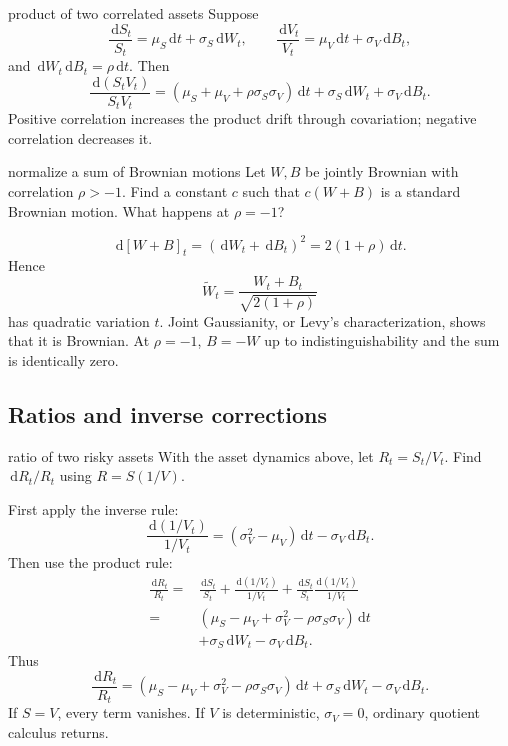 \documentclass[10pt]{article}
\newcommand{\1}{\mathbf 1}
\newcommand{\dd}{\,\mathrm d}
\theoremstyle{definition}
\begin{document}
\begin{boardexample}{product of two correlated assets}
Suppose
\[
\frac{\dd S_t}{S_t}
=\mu_S\dd t+\sigma_S\dd W_t,\qquad
\frac{\dd V_t}{V_t}
=\mu_V\dd t+\sigma_V\dd B_t,
\]
and \(\dd W_t\dd B_t=\rho\dd t\). Then
\[
\boxed{
\frac{\dd(S_tV_t)}{S_tV_t}
=\left(\mu_S+\mu_V+\rho\sigma_S\sigma_V\right)\dd t
+\sigma_S\dd W_t+\sigma_V\dd B_t.}
\]
Positive correlation increases the product drift through covariation;
negative correlation decreases it.
\end{boardexample}

\begin{studentexercise}{normalize a sum of Brownian motions}
Let \(W,B\) be jointly Brownian with correlation \(\rho>-1\). Find a
constant \(c\) such that \(c(W+B)\) is a standard Brownian motion. What
happens at \(\rho=-1\)?
\end{studentexercise}
\begin{shortsolution}
\[
\dd[W+B]_t
=(\dd W_t+\dd B_t)^2
=2(1+\rho)\dd t.
\]
Hence
\[
\boxed{
\widetilde W_t=\frac{W_t+B_t}{\sqrt{2(1+\rho)}}}
\]
has quadratic variation \(t\). Joint Gaussianity, or Levy's characterization,
shows that it is Brownian. At \(\rho=-1\), \(B=-W\) up to
indistinguishability and the sum is identically zero.
\end{shortsolution}

\subsection{Ratios and inverse corrections}

\begin{studentexercise}{ratio of two risky assets}
With the asset dynamics above, let \(R_t=S_t/V_t\). Find
\(\dd R_t/R_t\) using \(R=S(1/V)\).
\end{studentexercise}
\begin{shortsolution}
First apply the inverse rule:
\[
\frac{\dd(1/V_t)}{1/V_t}
=(\sigma_V^2-\mu_V)\dd t-\sigma_V\dd B_t.
\]
Then use the product rule:
\[
\begin{aligned}
\frac{\dd R_t}{R_t}
={}&\frac{\dd S_t}{S_t}
+\frac{\dd(1/V_t)}{1/V_t}
+\frac{\dd S_t}{S_t}
  \frac{\dd(1/V_t)}{1/V_t}\\
={}&\left(
\mu_S-\mu_V+\sigma_V^2-\rho\sigma_S\sigma_V
\right)\dd t\\
&+\sigma_S\dd W_t-\sigma_V\dd B_t.
\end{aligned}
\]
Thus
\[
\boxed{
\frac{\dd R_t}{R_t}
=\left(
\mu_S-\mu_V+\sigma_V^2-\rho\sigma_S\sigma_V
\right)\dd t
+\sigma_S\dd W_t-\sigma_V\dd B_t.}
\]
If \(S=V\), every term vanishes. If \(V\) is deterministic,
\(\sigma_V=0\), ordinary quotient calculus returns.
\end{shortsolution}
\end{document}
